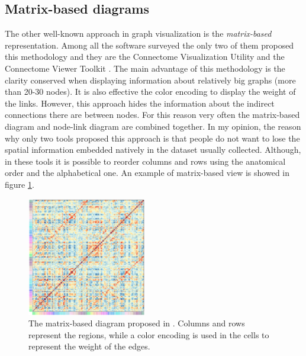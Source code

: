\documentclass{article}
\begin{document}
\begin{multicols}{2}
\subsection{Matrix-based diagrams}
\label{subsec:matrixbased}
The other well-known approach in graph visualization is the \textit{matrix-based} representation. Among all the software surveyed the only two of them proposed this methodology and they are the Connectome Visualization Utility and the Connectome Viewer Toolkit . The main advantage of this methodology is the clarity conserved when displaying information about relatively big graphs (more than 20-30 nodes). It is also effective the color encoding to display the weight of the links. However, this approach hides the information about the indirect connections there are between nodes. For this reason very often the matrix-based diagram and node-link diagram are combined together. In my opinion, the reason why only two tools proposed this approach is that people do not want to lose the spatial information embedded natively in the dataset usually collected. Although, in these tools it is possible to reorder columns and rows using the anatomical order and the alphabetical one. An example of matrix-based view is showed in figure \ref{fig:matrix}.
\begin{figure}[H]
\centering
\includegraphics[width = 0.9\columnwidth]{matrix}
\caption{The matrix-based diagram proposed in \cite{connectomeVisualizationUtility}. Columns and rows represent the regions, while a color encoding is used in the cells to represent the weight of the edges.}
\label{fig:matrix}
\end{figure}



\end{multicols}
\end{document}

